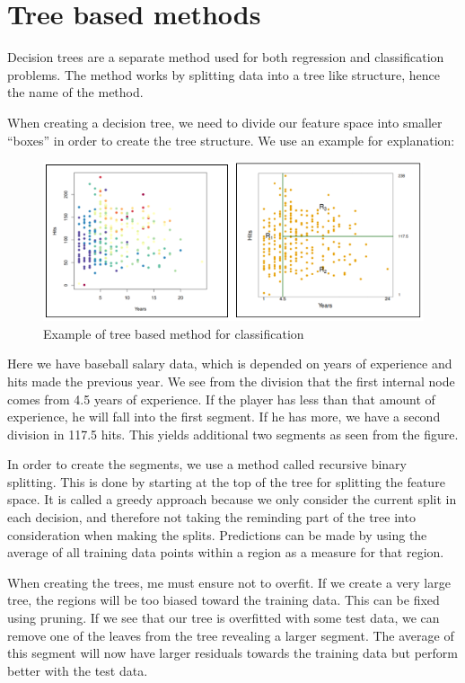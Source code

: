 
\chapter{Tree based methods}

Decision trees are a separate method used for both regression and classification problems. The method works by splitting data into a tree like structure, hence the name of the method. 

When creating a decision tree, we need to divide our feature space into smaller “boxes” in order to create the tree structure. We use an example for explanation:

\begin{figure}[H]
	\centering
	\includegraphics[width=\textwidth]{Img/tree_example.PNG}
	\caption{Example of tree based method for classification}
	\label{fig:tree_example}
\end{figure} 

Here we have baseball salary data, which is depended on years of experience and hits made the previous year. We see from the division that the first internal node comes from 4.5 years of experience. If the player has less than that amount of experience, he will fall into the first segment. If he has more, we have a second division in 117.5 hits. This yields additional two segments as seen from the figure. 

In order to create the segments, we use a method called recursive binary splitting. This is done by starting at the top of the tree for splitting the feature space. It is called a greedy approach because we only consider the current split in each decision, and therefore not taking the reminding part of the tree into consideration when making the splits. Predictions can be made by using the average of all training data points within a region as a measure for that region.  

When creating the trees, me must ensure not to overfit. If we create a very large tree, the regions will be too biased toward the training data. This can be fixed using pruning. If we see that our tree is overfitted with some test data, we can remove one of the leaves from the tree revealing a larger segment. The average of this segment will now have larger residuals towards the training data but perform better with the test data. 

